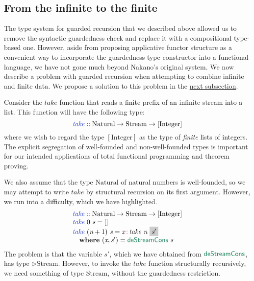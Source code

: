 \documentclass[natbib]{sigplanconf}
\newcommand{\cons}[1]{\textcolor{cons}{\textsf{#1}}}
\newcommand{\elim}[1]{\textcolor{elim}{\textsf{#1}}}
\newcommand{\kw}[1]{\textbf{#1}}
\newcommand{\tyname}[1]{\textrm{#1}}
\newcommand{\ident}[1]{\textit{#1}}
\newcommand{\defn}[1]{\textcolor{defnd}{\ident{#1}}}
\begin{document}
\subsection{From the infinite to the finite}
\label{sec:infinite-to-finite}

The type system for guarded recursion that we described above allowed
us to remove the syntactic guardedness check and replace it with a
compositional type-based one. However, aside from proposing
applicative functor structure as a convenient way to incorporate the
guardedness type constructor into a functional language, we have not
gone much beyond Nakano's original system. We now describe a problem
with guarded recursion when attempting to combine infinite and finite
data. We propose a solution to this problem in the
\hyperref[sec:clock-vars]{next subsection}.

Consider the $\ident{take}$ function that reads a finite prefix of an
infinite stream into a list. This function will have the following type:
\begin{displaymath}
  \defn{take} :: \tyname{Natural} \to \tyname{Stream} \to [\tyname{Integer}]
\end{displaymath}
where we wish to regard the type $[\tyname{Integer}]$ as the type of
\emph{finite} lists of integers. The explicit segregation of
well-founded and non-well-founded types is important for our intended
applications of total functional programming and theorem proving.

We also assume that the type $\tyname{Natural}$ of natural numbers is
well-founded, so we may attempt to write $\ident{take}$ by structural
recursion on its first argument. However, we run into a difficulty,
which we have \colorbox{greybg}{highlighted}.
\begin{displaymath}
  \begin{array}{l}
    \defn{take} :: \tyname{Natural} \to \tyname{Stream} \to [\tyname{Integer}] \\
    \defn{take}\ 0\ \ident{s} = [] \\
    \defn{take}\ (\ident{n}+1)\ \ident{s} = \ident{x} \mathop{\cons{:}} \ident{take}\ \ident{n}\ \colorbox{greybg}{$\ident{s$'$}$} \\
    \quad \kw{where}\ (\ident{x}, \ident{s$'$}) = \elim{deStreamCons}\ \ident{s}
  \end{array}
\end{displaymath}
The problem is that the variable $\ident{s$'$}$, which we have obtained
from $\elim{deStreamCons}$, has type $\rhd\tyname{Stream}$. However,
to invoke the $\ident{take}$ function structurally recursively, we
need something of type $\tyname{Stream}$, without the guardedness
restriction.
\end{document}

